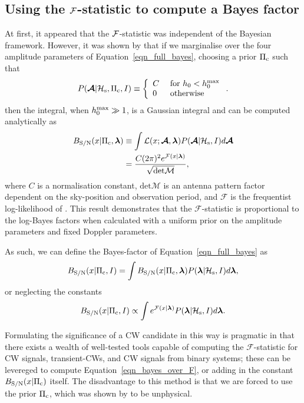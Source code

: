 \documentclass[aps, prd, twocolumn, superscriptaddress, floatfix, showpacs, nofootinbib, longbibliography]{revtex4-1}
\begin{document}
\subsection{Using the ${\mathcal{F}}$-statistic to compute a Bayes factor}
At first, it appeared that the ${\mathcal{F}}$-statistic was independent of the Bayesian
framework. However, it was shown by \citet{prix2009} that if we marginalise
over the four amplitude parameters of Equation~\eqref{eqn_full_bayes}, choosing
a prior $\Pi_{\rm c}$ such that
\begin{equation}
P(\boldsymbol{\mathcal{A}}| \mathcal{H}_{\rm s}, \Pi_{\rm c}, I) \equiv \left\{
\begin{array}{ll}
C & \textrm{ for } h_0 < h_0^{\rm max} \\
0 & \textrm{ otherwise}
\end{array}
\right..
\end{equation}
then the integral, when $h_0^{\rm max} \gg 1$, is a Gaussian integral and can be
computed analytically as
\begin{align}
B_{\rm S/N}(x| \Pi_{\rm c}, \boldsymbol{\mathbf{\lambda}}) & \equiv
\int
\mathcal{L}(x ;\boldsymbol{\mathcal{A}}, \boldsymbol{\mathbf{\lambda}})
P(\boldsymbol{\mathcal{A}}| \mathcal{H}_{\rm s}, I) d\boldsymbol{\mathcal{A}}
\\
& = \frac{C (2\pi)^{2} e^{{\mathcal{F}}(x| \boldsymbol{\mathbf{\lambda}})}}
{\sqrt{\textrm{det} \mathcal{M}}},
\end{align}
where $C$ is a normalisation constant, $\textrm{det}\mathcal{M}$ is an antenna
pattern factor dependent on the sky-position and observation period, and
$\mathcal{F}$ is the frequentist log-likelihood of \citet{jks1998}. This result
demonstrates that the $\mathcal{F}$-statistic is proportional to the log-Bayes
factors when calculated with a uniform prior on the amplitude parameters and
fixed Doppler parameters.

As such, we can define the Bayes-factor of Equation~\eqref{eqn_full_bayes} as
\begin{equation}
B_{\rm S/N}(x| \Pi_{\rm c}, I) = \int
B_{\rm S/N}(x| \Pi_{\rm c}, \boldsymbol{\mathbf{\lambda}}) P(\boldsymbol{\mathbf{\lambda}}| \mathcal{H}_{\rm s}, I)
 d\boldsymbol{\mathbf{\lambda}},
\end{equation}
or neglecting the constants
\begin{equation}
B_{\rm S/N}(x| \Pi_{\rm c}, I) \propto \int
e^{{\mathcal{F}}(x| \boldsymbol{\mathbf{\lambda}})} P(\boldsymbol{\mathbf{\lambda}}| \mathcal{H}_{\rm s}, I)
 d\boldsymbol{\mathbf{\lambda}}.
\label{eqn_bayes_over_F}
\end{equation}

Formulating the significance of a CW candidate in this way is pragmatic in that
there exists a wealth of well-tested tools \citep{lalsuite} capable of
computing the $\mathcal{F}$-statistic for CW signals, transient-CWs, and CW
signals from binary systems; these can be levereged to compute
Equation~\eqref{eqn_bayes_over_F}, or adding in the constant
$B_{\rm S/N}(x| \Pi_{\rm c})$ itself. The disadvantage to this method is that
we are forced to use the prior $\Pi_{\rm c}$, which was shown by \citet{prix2009} to
be unphysical.
\end{document}
